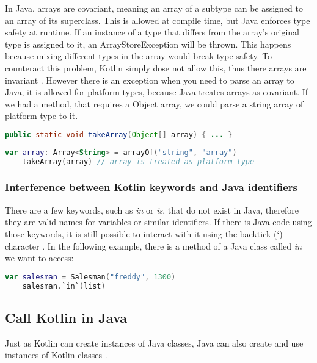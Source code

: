 \documentclass[a4paper, 11pt]{article}
\begin{document}
  In Java, arrays are covariant, meaning an array of a subtype can be assigned to an array of its superclass. This is allowed at compile time, but Java enforces type safety at runtime. If an instance of a type that differs from the array's original type is assigned to it, an ArrayStoreException will be thrown. This happens because mixing different types in the array would break type safety. To counteract this problem, Kotlin simply dose not allow this, thus there arrays are invariant \cite{interop-arrays}. However there is an exception when you need to parse an array to Java, it is allowed for platform types, because Java treates arrays as covariant. If we had a method, that requires a Object array, we could parse a string array of platform type to it.
  \begin{lstlisting}[language=Java]
    public static void takeArray(Object[] array) { ... }
  \end{lstlisting}
  \begin{lstlisting}[language=Kotlin]
    var array: Array<String> = arrayOf("string", "array")
    takeArray(array) // array is treated as platform type
  \end{lstlisting}

\subsubsection{Interference between Kotlin keywords and Java identifiers}
  There are a few keywords, such as \textit{in} or \textit{is}, that do not exist in Java, therefore they are valid names for variables or similar identifiers. If there is Java code using those keywords, it is still possible to interact with it using the backtick (`) character \cite{interop-escaping-identifiers}. In the following example, there is a method of a Java class called \textit{in} we want to access:
  \begin{lstlisting}[language=Kotlin]
    var salesman = Salesman("freddy", 1300)
    salesman.`in`(list)
  \end{lstlisting}

\subsection{Call Kotlin in Java}
  Just as Kotlin can create instances of Java classes, Java can also create and use instances of Kotlin classes \cite{interop-java}.
\end{document}
